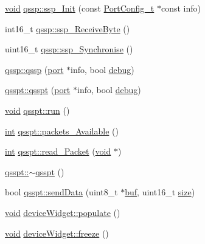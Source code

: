 \begin{DoxyCompactItemize}
\item 
\hyperlink{group___u_a_v_objects_plugin_ga444cf2ff3f0ecbe028adce838d373f5c}{void} \hyperlink{group___uploader_gaa7efad31d36502cca3aab3e4eed10d12}{qssp\-::ssp\-\_\-\-Init} (const \hyperlink{struct_port_config__t}{Port\-Config\-\_\-t} $\ast$const info)
\item 
int16\-\_\-t \hyperlink{group___uploader_gae06a33d9cc36f1b95bb0bc0a5ab8ca3a}{qssp\-::ssp\-\_\-\-Receive\-Byte} ()
\item 
uint16\-\_\-t \hyperlink{group___uploader_ga6f47e7cf74215ceeaf3d6234ef0c37b7}{qssp\-::ssp\-\_\-\-Synchronise} ()
\item 
\hyperlink{group___uploader_ga6b7f70326e497709fc513c3d122379cb}{qssp\-::qssp} (\hyperlink{classport}{port} $\ast$info, bool \hyperlink{synchronousprocess_8cpp_a3e279efabf854742684341c3e4f50d31a5be0fd270d9cbf6a0b7445db855089da}{debug})
\item 
\hyperlink{group___uploader_gaa7e3f69818d5f701e1c7191059b332ae}{qsspt\-::qsspt} (\hyperlink{classport}{port} $\ast$info, bool \hyperlink{synchronousprocess_8cpp_a3e279efabf854742684341c3e4f50d31a5be0fd270d9cbf6a0b7445db855089da}{debug})
\item 
\hyperlink{group___u_a_v_objects_plugin_ga444cf2ff3f0ecbe028adce838d373f5c}{void} \hyperlink{group___uploader_gac7b338eecc56ca930c6078162b168c83}{qsspt\-::run} ()
\item 
\hyperlink{ioapi_8h_a787fa3cf048117ba7123753c1e74fcd6}{int} \hyperlink{group___uploader_ga4fd481f6796cd770176f43ddc097ebe8}{qsspt\-::packets\-\_\-\-Available} ()
\item 
\hyperlink{ioapi_8h_a787fa3cf048117ba7123753c1e74fcd6}{int} \hyperlink{group___uploader_gab8eb0ccb0806be7a169c335cab1e4d0c}{qsspt\-::read\-\_\-\-Packet} (\hyperlink{group___u_a_v_objects_plugin_ga444cf2ff3f0ecbe028adce838d373f5c}{void} $\ast$)
\item 
\hyperlink{group___uploader_ga05f94a4538efa2bacd837e2b0684d6b3}{qsspt\-::$\sim$qsspt} ()
\item 
bool \hyperlink{group___uploader_ga7711ea10887bffa2d338e45bfdd564a2}{qsspt\-::send\-Data} (uint8\-\_\-t $\ast$\hyperlink{ioapi_8h_a8ad8a13c88886b9f623034ff88570adb}{buf}, uint16\-\_\-t \hyperlink{glext_8h_a014d89bd76f74ef3a29c8f04b473eb76}{size})
\item 
\hyperlink{group___u_a_v_objects_plugin_ga444cf2ff3f0ecbe028adce838d373f5c}{void} \hyperlink{group___uploader_gaf56d7d5fb2715ab7213ea4193df3b373}{device\-Widget\-::populate} ()
\item 
\hyperlink{group___u_a_v_objects_plugin_ga444cf2ff3f0ecbe028adce838d373f5c}{void} \hyperlink{group___uploader_gac5513bd475a701ede81cde9432e8ddf2}{device\-Widget\-::freeze} ()

\end{DoxyCompactItemize}
